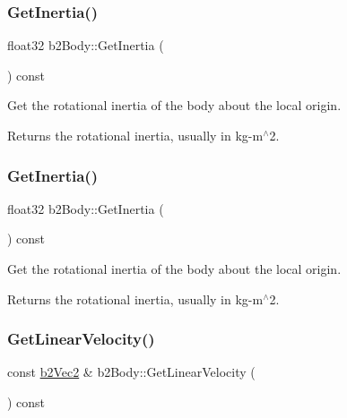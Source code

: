 \subsubsection{\texorpdfstring{Get\+Inertia()}{GetInertia()}\hspace{0.1cm}{\footnotesize\ttfamily [1/2]}}
{\footnotesize\ttfamily float32 b2\+Body\+::\+Get\+Inertia (\begin{DoxyParamCaption}{ }\end{DoxyParamCaption}) const\hspace{0.3cm}{\ttfamily [inline]}}

Get the rotational inertia of the body about the local origin. \begin{DoxyReturn}{Returns}
the rotational inertia, usually in kg-\/m$^\wedge$2. 
\end{DoxyReturn}
\mbox{\label{classb2Body_a60929c13e4b6548492dca5ec79f159db}} 
\subsubsection{\texorpdfstring{Get\+Inertia()}{GetInertia()}\hspace{0.1cm}{\footnotesize\ttfamily [2/2]}}
{\footnotesize\ttfamily float32 b2\+Body\+::\+Get\+Inertia (\begin{DoxyParamCaption}{ }\end{DoxyParamCaption}) const}

Get the rotational inertia of the body about the local origin. \begin{DoxyReturn}{Returns}
the rotational inertia, usually in kg-\/m$^\wedge$2. 
\end{DoxyReturn}
\mbox{\label{classb2Body_a8fcaf842141320701057f679dff90b89}} 
\subsubsection{\texorpdfstring{Get\+Linear\+Velocity()}{GetLinearVelocity()}\hspace{0.1cm}{\footnotesize\ttfamily [1/2]}}
{\footnotesize\ttfamily const \hyperlink{structb2Vec2}{b2\+Vec2} \& b2\+Body\+::\+Get\+Linear\+Velocity (\begin{DoxyParamCaption}{ }\end{DoxyParamCaption}) const\hspace{0.3cm}{\ttfamily [inline]}}

